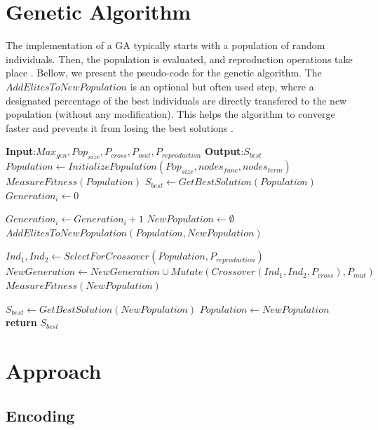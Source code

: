 \documentclass[runningheads]{llncs}
\begin{document}
\section{Genetic Algorithm}

The implementation of a GA typically starts with a population of random individuals. Then, the population is evaluated, and reproduction operations take place \cite{whitley1994genetic}. Bellow, we present the pseudo-code for the genetic algorithm. The $AddElitesToNewPopulation$ is an optional but often used step, where a designated percentage of the best individuals are directly transfered to the new population (without any modification). This helps the algorithm to converge faster and prevents it from losing the best solutions \cite{martins2016gacuda}.

\begin{algorithmic}
   \State \textbf{Input}:$Max_{gen},Pop_{size},P_{cross},P_{mut},P_{reproduction}$
   \State \textbf{Output}:$S_{best}$
   \State $Population\gets InitializePopulation(Pop_{size},nodes_{func},nodes_{term})$
   \State $MeasureFitness(Population)$ 
   \State $S_{best} \gets GetBestSolution(Population)$
   \State $Generation_{i} \gets 0$
   
      \State $Generation_{i} \gets Generation_{i} + 1$
      \State $NewPopulation \gets \emptyset$
      \State $AddElitesToNewPopulation(Population,NewPopulation)$ 
   
         \State $Ind_{1}, Ind_{2} \gets SelectForCrossover(Population, P_{reproduction})$
         \State $NewGeneration \gets NewGeneration \cup Mutate(Crossover(Ind_{1},Ind_{2},P_{cross}),P_{mut})$
         \State $MeasureFitness(NewPopulation)$
      \EndWhile
      
      \State $S_{best} \gets GetBestSolution(NewPopulation)$
      \State $Population \gets NewPopulation$
   \EndWhile
   \State \textbf{return} $S_{best}$
\end{algorithmic}

\section{Approach}

\subsection{Encoding}
\end{document}
